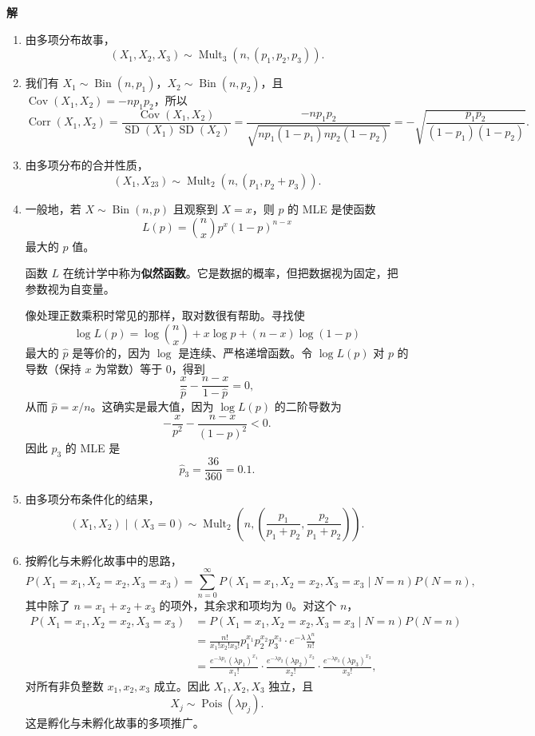 \documentclass[UTF8,12pt,a4paper,fontset=fandol]{ctexart}
\begin{document}
\noindent\textbf{解}\quad
\begin{enumerate}
  \item[(a)] 由多项分布故事，
  \[
    (X_1,X_2,X_3)\sim \operatorname{Mult}_3(n,(p_1,p_2,p_3)).
  \]
  \item[(b)] 我们有 $X_1\sim \operatorname{Bin}(n,p_1)$，$X_2\sim \operatorname{Bin}(n,p_2)$，且 $\operatorname{Cov}(X_1,X_2)=-np_1p_2$，所以
  \[
    \operatorname{Corr}(X_1,X_2)
    =\frac{\operatorname{Cov}(X_1,X_2)}{\operatorname{SD}(X_1)\operatorname{SD}(X_2)}
    =\frac{-np_1p_2}{\sqrt{np_1(1-p_1)np_2(1-p_2)}}
    =-\sqrt{\frac{p_1p_2}{(1-p_1)(1-p_2)}}.
  \]
  \item[(c)] 由多项分布的合并性质，
  \[
    (X_1,X_{23})\sim \operatorname{Mult}_2(n,(p_1,p_2+p_3)).
  \]
  \item[(d)] 一般地，若 $X\sim \operatorname{Bin}(n,p)$ 且观察到 $X=x$，则 $p$ 的 MLE 是使函数
  \[
    L(p)={n\choose x}p^x(1-p)^{n-x}
  \]
  最大的 $p$ 值。

  函数 $L$ 在统计学中称为\textbf{似然函数}。它是数据的概率，但把数据视为固定，把参数视为自变量。

  像处理正数乘积时常见的那样，取对数很有帮助。寻找使
  \[
    \log L(p)=\log {n\choose x}+x\log p+(n-x)\log(1-p)
  \]
  最大的 $\hat p$ 是等价的，因为 $\log$ 是连续、严格递增函数。令 $\log L(p)$ 对 $p$ 的导数（保持 $x$ 为常数）等于 $0$，得到
  \[
    \frac{x}{\hat p}-\frac{n-x}{1-\hat p}=0,
  \]
  从而 $\hat p=x/n$。这确实是最大值，因为 $\log L(p)$ 的二阶导数为
  \[
    -\frac{x}{p^2}-\frac{n-x}{(1-p)^2}<0.
  \]
  因此 $p_3$ 的 MLE 是
  \[
    \hat p_3=\frac{36}{360}=0.1.
  \]
  \item[(e)] 由多项分布条件化的结果，
  \[
    (X_1,X_2)\mid (X_3=0)
    \sim \operatorname{Mult}_2\left(n,\left(\frac{p_1}{p_1+p_2},\frac{p_2}{p_1+p_2}\right)\right).
  \]
  \item[(f)] 按孵化与未孵化故事中的思路，
  \[
    P(X_1=x_1,X_2=x_2,X_3=x_3)
    =\sum_{n=0}^{\infty}
    P(X_1=x_1,X_2=x_2,X_3=x_3\mid N=n)P(N=n),
  \]
  其中除了 $n=x_1+x_2+x_3$ 的项外，其余求和项均为 $0$。对这个 $n$，
  \[
  \begin{aligned}
    P(X_1=x_1,X_2=x_2,X_3=x_3)
    &=P(X_1=x_1,X_2=x_2,X_3=x_3\mid N=n)P(N=n)\\
    &=\frac{n!}{x_1!x_2!x_3!}p_1^{x_1}p_2^{x_2}p_3^{x_3}\cdot e^{-\lambda}\frac{\lambda^n}{n!}\\
    &=\frac{e^{-\lambda p_1}(\lambda p_1)^{x_1}}{x_1!}
      \cdot \frac{e^{-\lambda p_2}(\lambda p_2)^{x_2}}{x_2!}
      \cdot \frac{e^{-\lambda p_3}(\lambda p_3)^{x_3}}{x_3!},
  \end{aligned}
  \]
  对所有非负整数 $x_1,x_2,x_3$ 成立。因此 $X_1,X_2,X_3$ 独立，且
  \[
    X_j\sim \operatorname{Pois}(\lambda p_j).
  \]
  这是孵化与未孵化故事的多项推广。
\end{enumerate}
\end{document}
